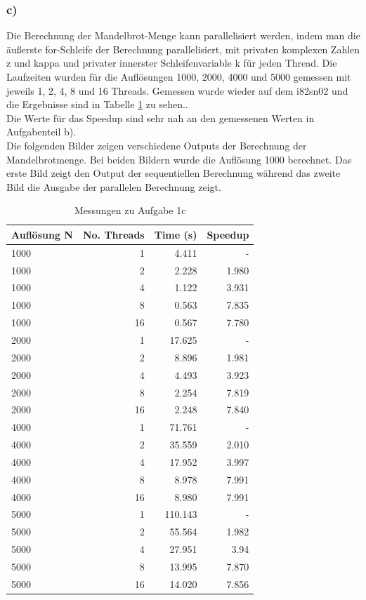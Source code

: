 \documentclass{report}
\begin{document}
        \subsubsection{c)}
        Die Berechnung der Mandelbrot-Menge kann parallelisiert werden, indem man die äußerste for-Schleife der Berechnung parallelisiert, mit privaten komplexen Zahlen z und kappa und privater innerster Schleifenvariable k für jeden Thread. Die Laufzeiten wurden für die Auflösungen 1000, 2000, 4000 und 5000 gemessen mit jeweils 1, 2, 4, 8 und 16 Threads. Gemessen wurde wieder auf dem i82sn02 und die Ergebnisse sind in Tabelle \ref{Table:1c} zu sehen..\\ 
		Die Werte für das Speedup sind sehr nah an den gemessenen Werten in Aufgabenteil b).\\
		Die folgenden Bilder zeigen verschiedene Outputs der Berechnung der Mandelbrotmenge. Bei beiden Bildern wurde die Auflösung 1000 berechnet. Das erste Bild zeigt den Output der sequentiellen Berechnung während das zweite Bild die Ausgabe der parallelen Berechnung zeigt.
		
        \begin{table}
        	\centering
        \begin{tabular}{|l|r|r|r|}
        	\hline
        	 Auflösung N & No. Threads &  Time (s) & Speedup \\
        	 	\hline
        	 1000& 1 &  4.411 & - \\
        	 1000& 2 &  2.228 & 1.980 \\
        	 1000& 4 &  1.122 & 3.931 \\
        	 1000& 8 &  0.563 & 7.835\\
        	 1000& 16 &  0.567 & 7.780 \\
        	\hline
        	2000& 1 & 17.625 & - \\
        	2000& 2 &  8.896& 1.981 \\
        	2000& 4 &  4.493& 3.923 \\
        	2000& 8 &  2.254& 7.819 \\
        	2000& 16 &  2.248& 7.840 \\
        	\hline
        	4000& 1 & 71.761 & - \\
        	4000& 2 &  35.559 & 2.010 \\
        	4000& 4 &  17.952& 3.997 \\
        	4000& 8 &  8.978 & 7.991\\
        	4000& 16 &  8.980 & 7.991 \\
        	\hline
        	5000& 1 &  110.143 & - \\
        	5000& 2 &  55.564 & 1.982 \\
        	5000& 4 &  27.951 & 3.94 \\
        	5000& 8 &  13.995 & 7.870 \\
        	5000& 16 &  14.020 & 7.856\\
        	\hline
        \end{tabular}
        \caption{Messungen zu Aufgabe 1c}
         \label{Table:1c}
        \end{table}
    
\end{document}
